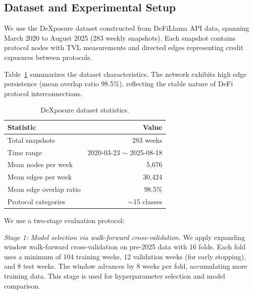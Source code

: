 \documentclass[preprint,12pt]{elsarticle}
\renewcommand{\paragraph}[1]{}
\begin{document}
\subsection{Dataset and Experimental Setup}
\label{subsec:dataset}

\paragraph{Data source.}
We use the DeXposure dataset constructed from DeFiLlama API data, spanning March 2020 to August 2025 (283 weekly snapshots). Each snapshot contains protocol nodes with TVL measurements and directed edges representing credit exposures between protocols.

\paragraph{Data statistics.}
Table~\ref{tab:data-stats} summarizes the dataset characteristics. The network exhibits high edge persistence (mean overlap ratio 98.5\%), reflecting the stable nature of DeFi protocol interconnections.

\begin{table}[t]
\centering
\small
\begin{tabular}{lr}
\hline
\textbf{Statistic} & \textbf{Value} \\
\hline
Total snapshots & 283 weeks \\
Time range & 2020-03-23 $\sim$ 2025-08-18 \\
Mean nodes per week & 5,676 \\
Mean edges per week & 30,424 \\
Mean edge overlap ratio & 98.5\% \\
Protocol categories & $\sim$15 classes \\
\hline
\end{tabular}
\caption{DeXposure dataset statistics.}
\label{tab:data-stats}
\end{table}

\paragraph{Temporal split.}
We use a two-stage evaluation protocol:

\textit{Stage 1: Model selection via walk-forward cross-validation.}
We apply expanding window walk-forward cross-validation on pre-2025 data with 16 folds. Each fold uses a minimum of 104 training weeks, 12 validation weeks (for early stopping), and 8 test weeks. The window advances by 8 weeks per fold, accumulating more training data. This stage is used for hyperparameter selection and model comparison.
\end{document}

